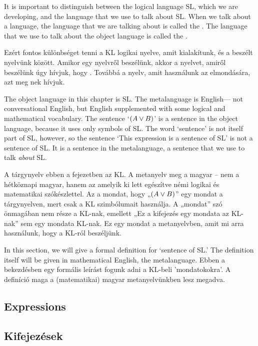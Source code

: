 It is important to distinguish between the logical language SL, which we are developing, and the language that we use to talk about SL. When we talk about a language, the language that we are talking about is called the . The language that we use to talk about the object language is called the .
\label{def.metalanguage}

Ezért fontos különbséget tenni a KL logikai nyelve, amit kialakítunk, és a beszélt nyelvünk között. Amikor egy nyelvről beszélünk, akkor a nyelvet, amiről beszélünk úgy hívjuk, hogy . Továbbá a nyelv, amit használunk az elmondására, azt meg nek hívjuk.
\label{def.metanyelv}

The object language in this chapter is SL. The metalanguage is English--- not conversational English, but English supplemented with some logical and mathematical vocabulary. The sentence `$(A\vee B)$' is a sentence in the object language, because it uses only symbols of SL. The word `sentence' is not itself part of SL, however, so the sentence `This expression is a sentence of SL' is not a sentence of SL. It is a sentence in the metalanguage, a sentence that we use to talk \emph{about} SL.

A tárgynyelv ebben a fejezetben az KL. A metanyelv meg a magyar -- nem a hétköznapi magyar, hanem az amelyik ki lett egészítve némi logikai és matematikai szókészlettel. Az a mondat, hogy „$(A\vee B)$” egy mondat a tárgynyelven, mert csak a KL szimbólumait használja. A „mondat” szó önmagában nem része a KL-nak, emellett „Ez a kifejezés egy mondata az KL-nak” sem egy mondata KL-nak. Ez egy mondat a metanyelvben, amit mi arra használunk, hogy a KL-ról beszéljünk.


In this section, we will give a formal definition for `sentence of SL.' The definition itself will be given in mathematical English, the metalanguage.
Ebben a bekezdésben egy formális leírást fogunk adni a KL-beli 'mondatokokra'. A definíció maga a (matematikai) magyar metanyelvünkben lesz megadva.

\subsection*{Expressions}
\subsection{Kifejezések}

